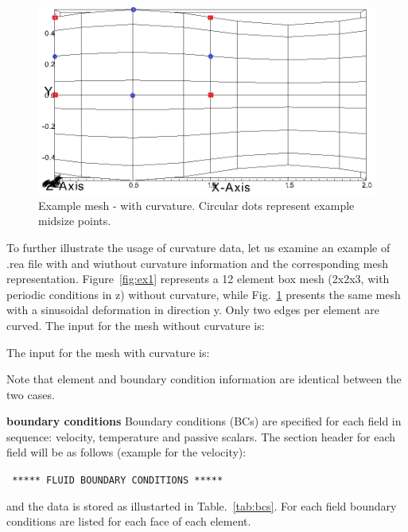 \begin{description}
\begin{figure}
\begin{center}
\includegraphics[scale=0.5]{Figs/modified1}
\caption{Example mesh -  with curvature. Circular dots represent example midsize points. }
\label{fig:ex2}
\end{center}
\end{figure}


To further illustrate the usage of curvature data, let us examine an example of .rea file with and wiuthout curvature information and the corresponding mesh representation. Figure~\ref{fig:ex1} represents a 12 element box mesh (2x2x3, with periodic conditions in z) without curvature, while Fig.~\ref{fig:ex2} presents the same mesh with a sinusoidal deformation in direction y. Only two edges per element are curved. 
The input for the mesh without curvature is:



The input for the mesh with curvature is: 



Note that element and boundary condition information are identical between the two cases.

\item{\bf boundary conditions} 
     Boundary conditions (BCs) are specified for each field in sequence: velocity, temperature and passive scalars. The section header for each field will be as follows (example for the velocity):
     \begin{center}
     \texttt{ ***** FLUID   BOUNDARY CONDITIONS *****}

     \end{center}
     and the data is stored as illustarted in Table.~\ref{tab:bcs}. For each field boundary conditions are listed for each face of each element. 


\end{description}

